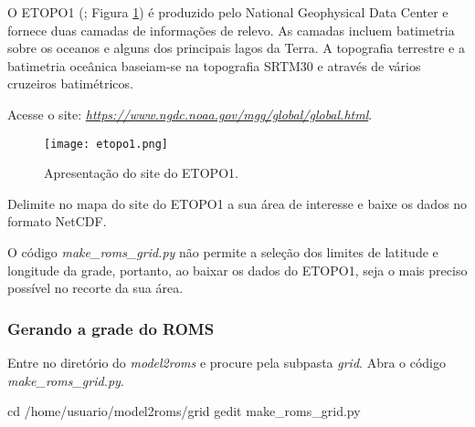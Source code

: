 \noindent O ETOPO1 (\cite{Amante2009}; Figura \textcolor{bleu_cite}{\ref{etopo1}}) é produzido pelo National Geophysical Data Center e fornece duas camadas de informações de relevo. As camadas incluem batimetria sobre os oceanos e alguns dos principais lagos da Terra. A topografia terrestre e a batimetria oceânica baseiam-se na topografia SRTM30 e através de vários cruzeiros batimétricos. 
\bigskip

\noindent Acesse o site: \textcolor{bleu_cite}{\href{https://www.ngdc.noaa.gov/mgg/global/global.html}{\textit{https://www.ngdc.noaa.gov/mgg/global/global.html}}}.
\bigskip
   
\begin{figure}[H]
    \centering
    \texttt{[image: etopo1.png]}
    \caption{Apresentação do site do ETOPO1.}
    \label{etopo1}
\end{figure}
\bigskip

\noindent Delimite no mapa do site do ETOPO1 a sua área de interesse e baixe os dados no formato NetCDF. 
\bigskip

\begin{tcolorbox}[enhanced,
    grow to left by   = 0cm,
    grow to right by  = 0cm,
    enlarge top by    = 0cm,
    enlarge bottom by = 0cm,
    tcbox raise base,
    boxrule           = 1.0pt,
    left              = 18mm,
    colframe          = red!50!black,coltext=red!25!black,colback=red!10!white,
    overlay           = {\begin{tcbclipinterior}\fill[red!75!blue!50!white] (frame.south west)
      rectangle node[text=white,font=\sffamily\bfseries\footnotesize,rotate=0] {ATENÇÃO} ([xshift=18mm]frame.north west);\end{tcbclipinterior}}]
  O código \textit{make\_roms\_grid.py} não permite a seleção dos limites de latitude e longitude da grade, portanto, ao baixar os dados do ETOPO1, seja o mais preciso possível no recorte da sua área.
\end{tcolorbox}
\bigskip

\subsubsection{Gerando a grade do ROMS}

\noindent Entre no diretório do \textit{model2roms} e procure pela subpasta \textit{grid}. Abra o código \textit{make\_roms\_grid.py}.
\bigskip

\begin{bashcode}
cd /home/usuario/model2roms/grid
gedit make_roms_grid.py
\end{bashcode}
\bigskip


